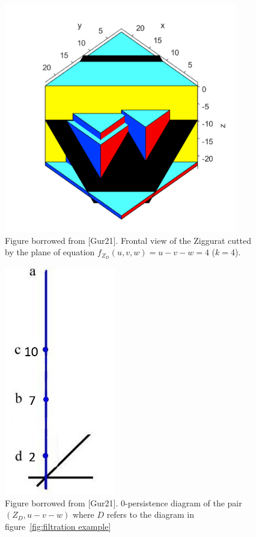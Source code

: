 \documentclass[english, LaM, oneside, noexaminfo]{sapthesis}
\begin{document}
\begin{figure}[tb]
\centering
\includegraphics[height=10cm]{Ziggurat 3D k=10.png}
\caption{Figure borrowed from [Gur21]. Frontal view of the Ziggurat cutted by the plane of equation $f_{Z_D}(u,v,w) = u-v-w = 4$ ($k=4$).}\label{fig:Ziggurat 3D k=10}
\end{figure}

\begin{figure}[tb]
\centering
\includegraphics[height=10cm]{Ziggurat persistence diagram.png}
\caption{Figure borrowed from [Gur21]. $0$-persistence diagram of the pair $(Z_D, u-v-w)$
where $D$ refers to the diagram in figure~\ref{fig:filtration example}}\label{fig:Ziggurat persistence diagram}
\end{figure}
\end{document}
